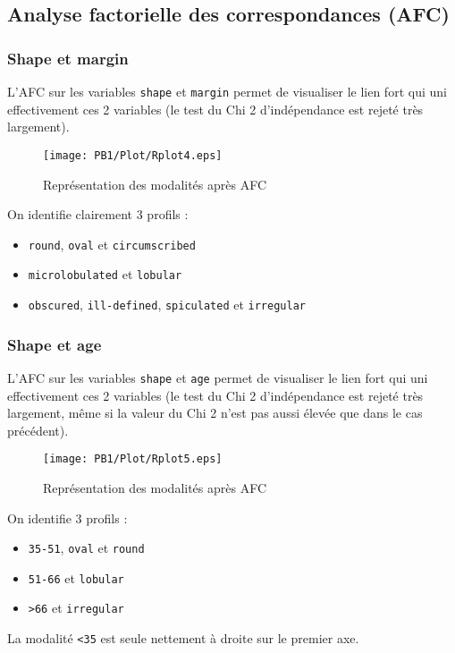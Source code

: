 \documentclass[a4paper]{report}
\begin{document}
  \subsection{Analyse factorielle des correspondances (AFC)}
   
   \subsubsection{Shape et margin}
   L'AFC sur les variables \verb|shape| et \verb|margin| permet de visualiser le lien fort qui uni effectivement ces 2 variables (le test du Chi 2 d'indépendance est rejeté très largement). 

      \begin{figure}[!ht]
	\centering
     	\texttt{[image: PB1/Plot/Rplot4.eps]}

	\caption{Représentation des modalités après AFC}
\end{figure}

   On identifie clairement 3 profils : 
   \begin{itemize}
   \item \verb|round|, \verb|oval| et \verb|circumscribed|
   \item \verb|microlobulated| et \verb|lobular|
   \item \verb|obscured|, \verb|ill-defined|, \verb|spiculated| et \verb|irregular|
   \end{itemize}
   
   
      \subsubsection{Shape et age}
   L'AFC sur les variables \verb|shape| et \verb|age| permet de visualiser le lien fort qui uni effectivement ces 2 variables (le test du Chi 2 d'indépendance est rejeté très largement, même si la valeur du Chi 2 n'est pas aussi élevée que dans le cas précédent). 

      \begin{figure}[!ht]
	\centering
     	\texttt{[image: PB1/Plot/Rplot5.eps]}

	\caption{Représentation des modalités après AFC}
\end{figure}

   On identifie 3 profils : 
   \begin{itemize}
      \item \verb|35-51|, \verb|oval| et \verb|round|
   \item \verb|51-66| et \verb|lobular|
      \item \verb|>66| et \verb|irregular|
   \end{itemize}
   La modalité \verb|<35| est seule nettement à droite sur le premier axe.
\end{document}
